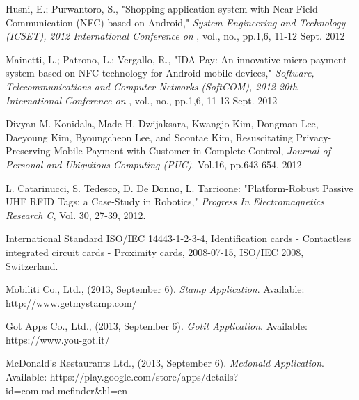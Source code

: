 \documentclass[12pt,a4paper]{article}
\begin{document}
\begin{thebibliography}{depth}

 Husni, E.; Purwantoro, S., "Shopping application system with Near Field Communication (NFC) based on Android," {\itshape System Engineering and Technology (ICSET), 2012 International Conference on} , vol., no., pp.1,6, 11-12 Sept. 2012
  
 Mainetti, L.; Patrono, L.; Vergallo, R., "IDA-Pay: An innovative micro-payment system based on NFC technology for Android mobile devices," {\itshape Software, Telecommunications and Computer Networks (SoftCOM), 2012 20th International Conference on} , vol., no., pp.1,6, 11-13 Sept. 2012

 Divyan M. Konidala, Made H. Dwijaksara, Kwangjo Kim, Dongman Lee, Daeyoung Kim, Byoungcheon Lee, and Soontae Kim, Resuscitating Privacy-Preserving Mobile Payment with Customer in Complete Control, {\itshape Journal of Personal and Ubiquitous Computing (PUC)}. Vol.16, pp.643-654, 2012
  
 L. Catarinucci, S. Tedesco, D. De Donno, L. Tarricone: "Platform-Robust Passive UHF RFID Tags: a Case-Study in Robotics," {\itshape Progress In Electromagnetics Research C}, Vol. 30, 27-39, 2012.
  
 International Standard ISO/IEC 14443-1-2-3-4, Identification cards - Contactless integrated circuit cards - Proximity cards, 2008-07-15, ISO/IEC 2008, Switzerland.

 Mobiliti Co., Ltd., (2013, September 6). {\itshape Stamp Application}. Available: http://www.getmystamp.com/

 Got Apps Co., Ltd., (2013, September 6). {\itshape Gotit Application}. Available: https://www.you-got.it/

 McDonald's Restaurants Ltd., (2013, September 6). {\itshape Mcdonald Application}. Available: https://play.google.com/store/apps/details?id=com.md.mcfinder\&hl=en

\end{thebibliography}
\end{document}
